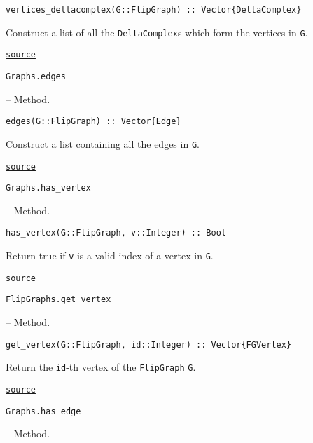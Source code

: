 \begin{adjustwidth}{2em}{0pt}


\begin{verbatim}
vertices_deltacomplex(G::FlipGraph) :: Vector{DeltaComplex}
\end{verbatim}

Construct a list of all the \texttt{DeltaComplex}s which form the vertices in \texttt{G}.



\href{https://github.com/schto223/FlipGraphs.jl/blob/e35d43698a06b86273148826b79d585ba04fcd26/src/flipGraph.jl#L249-L253}{\texttt{source}}


\end{adjustwidth}
\hypertarget{13528482185720073226}{\texttt{Graphs.edges}}  -- {Method.}

\begin{adjustwidth}{2em}{0pt}


\begin{verbatim}
edges(G::FlipGraph) :: Vector{Edge}
\end{verbatim}

Construct a list containing all the edges in \texttt{G}.



\href{https://github.com/schto223/FlipGraphs.jl/blob/e35d43698a06b86273148826b79d585ba04fcd26/src/flipGraph.jl#L173-L177}{\texttt{source}}


\end{adjustwidth}
\hypertarget{10831218003372438250}{\texttt{Graphs.has\_vertex}}  -- {Method.}

\begin{adjustwidth}{2em}{0pt}


\begin{verbatim}
has_vertex(G::FlipGraph, v::Integer) :: Bool
\end{verbatim}

Return true if \texttt{v} is a valid index of a vertex in \texttt{G}.



\href{https://github.com/schto223/FlipGraphs.jl/blob/e35d43698a06b86273148826b79d585ba04fcd26/src/flipGraph.jl#L205-L209}{\texttt{source}}


\end{adjustwidth}
\hypertarget{12246764547045339836}{\texttt{FlipGraphs.get\_vertex}}  -- {Method.}

\begin{adjustwidth}{2em}{0pt}


\begin{verbatim}
get_vertex(G::FlipGraph, id::Integer) :: Vector{FGVertex}
\end{verbatim}

Return the \texttt{id}-th vertex of the \texttt{FlipGraph} \texttt{G}.



\href{https://github.com/schto223/FlipGraphs.jl/blob/e35d43698a06b86273148826b79d585ba04fcd26/src/flipGraph.jl#L242-L246}{\texttt{source}}


\end{adjustwidth}
\hypertarget{4723161772743408612}{\texttt{Graphs.has\_edge}}  -- {Method.}

